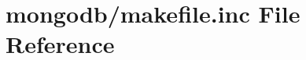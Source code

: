 \hypertarget{mongodb_2makefile_8inc}{\section{mongodb/makefile.inc \-File \-Reference}
\label{mongodb_2makefile_8inc}
}
